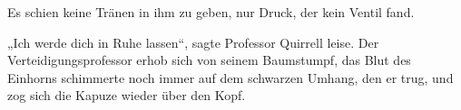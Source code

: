 Es schien keine Tränen in ihm zu geben, nur Druck, der kein Ventil fand.

„Ich werde dich in Ruhe lassen“, sagte Professor Quirrell leise. Der Verteidigungsprofessor erhob sich von seinem Baumstumpf, das Blut des Einhorns schimmerte noch immer auf dem schwarzen Umhang, den er trug, und zog sich die Kapuze wieder über den Kopf.


